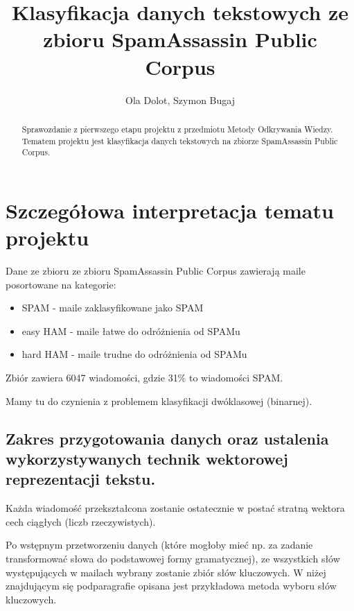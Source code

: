\documentclass[fleqn]{article}
\begin{document}
\title{Klasyfikacja danych tekstowych ze zbioru SpamAssassin Public Corpus}
\author{Ola Dolot, Szymon Bugaj}

\maketitle

\begin{abstract}
Sprawozdanie z pierwszego etapu projektu z przedmiotu Metody Odkrywania Wiedzy.
Tematem projektu jest klasyfikacja danych tekstowych na zbiorze SpamAssassin Public Corpus.
\end{abstract}

\tableofcontents










\section{Szczegółowa interpretacja tematu projektu}
Dane ze zbioru ze zbioru SpamAssassin Public Corpus zawierają maile posortowane na kategorie:
\begin{itemize}
    \item SPAM     - maile zaklasyfikowane jako SPAM
    \item easy HAM - maile łatwe do odróżnienia od SPAMu
    \item hard HAM - maile trudne do odróżnienia od SPAMu
\end{itemize}

Zbiór zawiera 6047 wiadomości, gdzie 31\% to wiadomości SPAM.

Mamy tu do czynienia z problemem klasyfikacji dwóklasowej (binarnej).

\subsection{Zakres przygotowania danych oraz ustalenia wykorzystywanych technik wektorowej reprezentacji tekstu.}
Każda wiadomość przekształcona zostanie ostatecznie w postać stratną wektora cech ciągłych (liczb rzeczywistych).

Po wstępnym przetworzeniu danych (które mogłoby mieć np. za zadanie transformować słowa do podstawowej formy gramatycznej), ze wszystkich słów występujących w mailach wybrany zostanie zbiór słów kluczowych. W niżej znajdującym się podparagrafie opisana jest przykładowa metoda wyboru słów kluczowych. 
\end{document}
